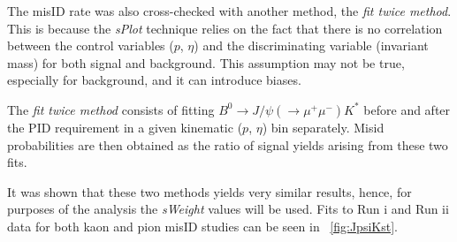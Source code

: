 \color{black}

The misID rate was also cross-checked with another method, the \textit{fit twice method}. This is because the \textit{sPlot} technique relies on the fact that there is no correlation between the control variables ($p$, $\eta$) and the discriminating variable (invariant mass) for both signal and background. This assumption may not be true, especially for background, and it can introduce biases.

The \textit{fit twice method} consists of fitting $B^{0} \rightarrow J/\psi(\rightarrow \mu^{+} \mu^{-}) K^{*}$ before and after the \gls{PID} requirement in a given kinematic ($p$, $\eta$) bin separately. Misid probabilities are then obtained as the ratio of signal yields arising from these two fits.


It was shown that these two methods yields very similar results, hence,
for purposes of the \Bmumumu analysis the \textit{sWeight} values will be used. Fits to Run \Rn{1} and Run \Rn{2} data for both kaon and pion misID studies can be seen in ~\autoref{fig:JpsiKst}.
